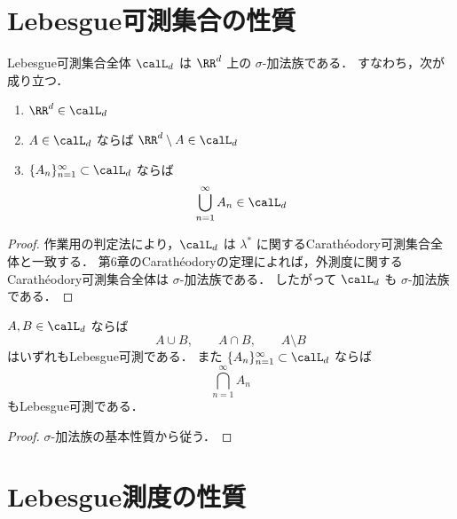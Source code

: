 
\section{Lebesgue可測集合の性質}

\begin{theorem}
Lebesgue可測集合全体 $\calL_d$ は $\RR^d$ 上の $\sigma$-加法族である．
すなわち，次が成り立つ．
\begin{enumerate}
    \item $\RR^d\in\calL_d$
    \item $A\in\calL_d$ ならば $\RR^d\setminus A\in\calL_d$
    \item $\{A_n\}_{n=1}^{\infty}\subset\calL_d$ ならば
    \[
    \bigcup_{n=1}^{\infty}A_n\in\calL_d
    \]
\end{enumerate}
\end{theorem}
\begin{proof}
作業用の判定法により，$\calL_d$ は
$\lambda^*$ に関するCarathéodory可測集合全体と一致する．
第6章のCarathéodoryの定理によれば，外測度に関するCarathéodory可測集合全体は
$\sigma$-加法族である．
したがって $\calL_d$ も $\sigma$-加法族である．
\end{proof}

\begin{corollary}[集合演算]
$A,B\in\calL_d$ ならば
\[
A\cup B,\qquad A\cap B,\qquad A\setminus B
\]
はいずれもLebesgue可測である．
また $\{A_n\}_{n=1}^{\infty}\subset\calL_d$ ならば
\[
\bigcap_{n=1}^{\infty}A_n
\]
もLebesgue可測である．
\end{corollary}
\begin{proof}
$\sigma$-加法族の基本性質から従う．
\end{proof}

\section{Lebesgue測度の性質}

